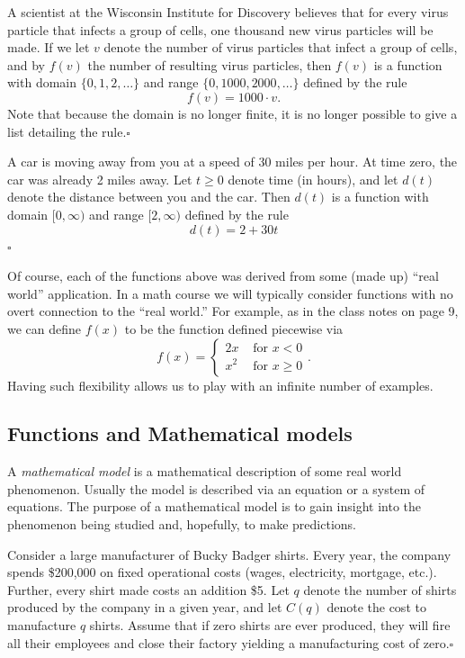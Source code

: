 \begin{example}
  A scientist at the Wisconsin Institute for Discovery believes that
  for every virus particle that infects a group of cells, one thousand
  new virus particles will be made.  If we let $v$ denote the number
  of virus particles that infect a group of cells, and by $f(v)$ the
  number of resulting virus particles, then $f(v)$ is a function with
  domain $\{0,1,2,\dots\}$ and range $\{0, 1000, 2000, \dots\}$
  defined by the rule
  \[
  f(v) = 1000\cdot v.
  \]
  Note that because the domain is no longer finite, it is no longer
  possible to give a list detailing the rule.\hfill $\square$
\end{example}

\begin{example}
  A car is moving away from you at a speed of 30 miles per hour.  At
  time zero, the car was already 2 miles away.  Let $t\ge 0$ denote
  time (in hours), and let $d(t)$ denote the distance between you and
  the car.  Then $d(t)$ is a function with domain $[0,\infty)$ and
  range $[2,\infty)$ defined by the rule
  \[
  d(t) = 2 + 30t
  \]\hfill $\square$
\end{example}

\vspace{.1in}

Of course, each of the functions above was derived from some (made up)
``real world'' application.  In a math course we will typically
consider functions with no overt connection to the ``real world.''
For example, as in the class notes on page 9, we can define $f(x)$ to
be the function defined piecewise via
\[
f(x) = \left\{\begin{array}{cc}
  2x & \text{ for } x < 0\\
  x^2 & \text{ for } x \ge 0
\end{array}\right..
\]
Having such flexibility allows us to play with an infinite number of
examples.

\subsection{Functions and Mathematical models}

A \textit{mathematical model} is a mathematical description of some
real world phenomenon.  Usually the model is described via an equation
or a system of equations.  The purpose of a mathematical model is to
gain insight into the phenomenon being studied and, hopefully, to make
predictions.

\begin{example}\label{example:manufacture}
  Consider a large manufacturer of Bucky Badger shirts.  Every year,
  the company spends \$200,000 on fixed operational costs (wages,
  electricity, mortgage, etc.).  Further, every shirt made costs an
  addition \$5.  Let $q$ denote the number of shirts produced by the
  company in a given year, and let $C(q)$ denote the cost to
  manufacture $q$ shirts.  Assume that if zero shirts are ever
  produced, they will fire all their employees and close their factory
  yielding a manufacturing cost of zero.\hfill$\square$

\end{example}

